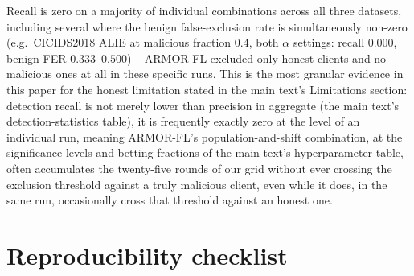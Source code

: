 \documentclass[a4paper,11pt]{article}
\begin{document}
Recall is zero on a majority of individual combinations across all three datasets, including several where the benign false-exclusion rate is simultaneously non-zero (e.g.\ CICIDS2018 ALIE at malicious fraction 0.4, both $\alpha$ settings: recall $0.000$, benign FER $0.333$--$0.500$) -- ARMOR-FL excluded only honest clients and no malicious ones at all in these specific runs. This is the most granular evidence in this paper for the honest limitation stated in the main text's Limitations section: detection recall is not merely lower than precision in aggregate (the main text's detection-statistics table), it is frequently exactly zero at the level of an individual run, meaning ARMOR-FL's population-and-shift combination, at the significance levels and betting fractions of the main text's hyperparameter table, often accumulates the twenty-five rounds of our grid without ever crossing the exclusion threshold against a truly malicious client, even while it does, in the same run, occasionally cross that threshold against an honest one.

\section{Reproducibility checklist}\label{app:repro}
\end{document}
